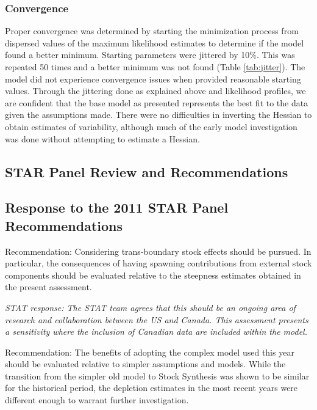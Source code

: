 \documentclass[12pt,]{article}
\begin{document}
\subsubsection{Convergence}\label{convergence}

Proper convergence was determined by starting the minimization process
from dispersed values of the maximum likelihood estimates to determine
if the model found a better minimum. Starting parameters were jittered
by 10\%. This was repeated 50 times and a better minimum was not found
(Table \ref{tab:jitter}). The model did not experience convergence
issues when provided reasonable starting values. Through the jittering
done as explained above and likelihood profiles, we are confident that
the base model as presented represents the best fit to the data given
the assumptions made. There were no difficulties in inverting the
Hessian to obtain estimates of variability, although much of the early
model investigation was done without attempting to estimate a Hessian.

\subsection{STAR Panel Review and
Recommendations}\label{star-panel-review-and-recommendations}

\subsection{Response to the 2011 STAR Panel
Recommendations}\label{response-to-the-2011-star-panel-recommendations}

Recommendation: Considering trans-boundary stock effects should be
pursued. In particular, the consequences of having spawning
contributions from external stock components should be evaluated
relative to the steepness estimates obtained in the present assessment.

\emph{STAT response: The STAT team agrees that this should be an ongoing
area of research and collaboration between the US and Canada. This
assessment presents a sensitivity where the inclusion of Canadian data
are included within the model.}

Recommendation: The benefits of adopting the complex model used this
year should be evaluated relative to simpler assumptions and models.
While the transition from the simpler old model to Stock Synthesis was
shown to be similar for the historical period, the depletion estimates
in the most recent years were different enough to warrant further
investigation.
\end{document}
